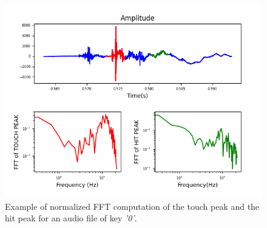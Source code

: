 \begin{figure}[h]
     \centering
     \includegraphics[width=.9\linewidth]{Images/AcCAPPCHA/feature_example}
     \caption{\footnotesize{Example of normalized FFT computation of the touch peak and the hit peak for an audio file of key \textit{'0'}.}}\label{AcCAPPCHA:feature_example}
\end{figure}

